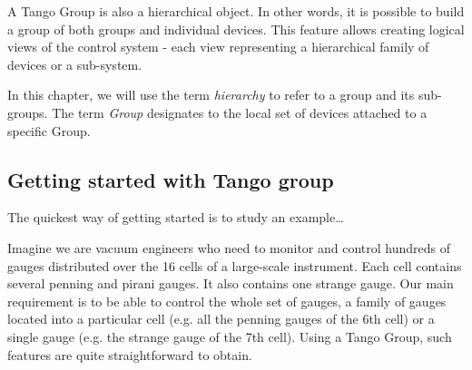 A Tango Group is also a hierarchical object. In other words, it is
possible to build a group of both groups and individual devices. This
feature allows creating logical views of the control system - each
view representing a hierarchical family of devices or a sub-system. 

In this chapter, we will use the term \emph{hierarchy} to refer to
a group and its sub-groups. The term \emph{Group} designates to the
local set of devices attached to a specific Group. 


\subsection{Getting started with Tango group}

The quickest way of getting started is to study an example\ldots{}

Imagine we are vacuum engineers who need to monitor and control hundreds
of gauges distributed over the 16 cells of a large-scale instrument.
Each cell contains several penning and pirani gauges. It also contains
one \textquotedbl{}strange\textquotedbl{} gauge. Our main requirement
is to be able to control the whole set of gauges, a family of gauges
located into a particular cell (e.g. all the penning gauges of the
6th cell) or a single gauge (e.g. the strange gauge of the 7th cell).
Using a Tango Group, such features are quite straightforward to obtain. 

